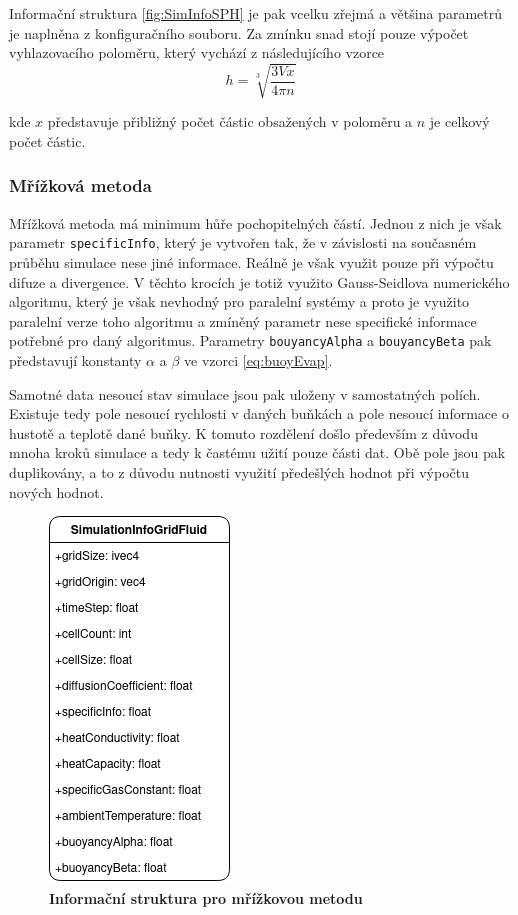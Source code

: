 \newpage

Informační struktura \ref{fig:SimInfoSPH} je pak vcelku zřejmá a většina parametrů je naplněna z konfiguračního souboru. Za zmínku snad stojí pouze výpočet vyhlazovacího poloměru, který vychází z následujícího vzorce
\begin{equation}
    h=\sqrt[3]{\frac{3 V x}{4 \pi n}}
\end{equation}

kde $x$ představuje přibližný počet částic obsažených v poloměru a $n$ je celkový počet částic.


\subsubsection{Mřížková metoda}
Mřížková metoda má minimum hůře pochopitelných částí. Jednou z nich je však parametr \texttt{specificInfo}, který je vytvořen tak, že v závislosti na současném průběhu simulace nese jiné informace. Reálně je však využit pouze při výpočtu difuze a divergence. V těchto krocích je totiž využito Gauss-Seidlova numerického algoritmu, který je však nevhodný pro paralelní systémy a proto je využito paralelní verze toho algoritmu a zmíněný parametr nese specifické informace potřebné pro daný algoritmus. Parametry \texttt{bouyancyAlpha} a \texttt{bouyancyBeta} pak představují konstanty $\alpha$ a $\beta$ ve vzorci \ref{eq:buoyEvap}.

Samotné data nesoucí stav simulace jsou pak uloženy v samostatných polích. Existuje tedy pole nesoucí rychlosti v daných buňkách a pole nesoucí informace o hustotě a teplotě dané buňky. K tomuto rozdělení došlo především z důvodu mnoha kroků simulace a tedy k častému užití pouze části dat. Obě pole jsou pak duplikovány, a to z důvodu nutnosti využití předešlých hodnot při výpočtu nových hodnot. 

\begin{figure}[hbt]
	\centering
	\captionsetup{justification=centering}
	\includegraphics[scale=0.6]{obrazky-figures/SimulationInfoGridFluid.png}
	\caption{\textbf{Informační struktura pro mřížkovou metodu}}
	\label{fig:structsGrid}
\end{figure}

